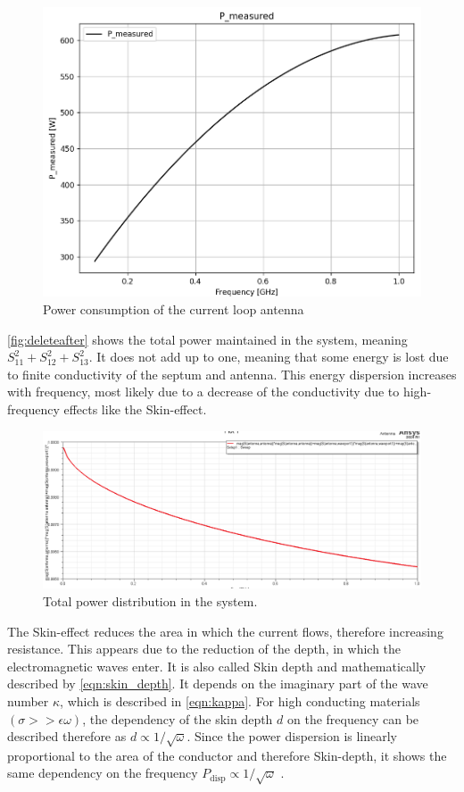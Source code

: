 \begin{figure}[h]
	\centering
	\includegraphics[width=0.5\linewidth]{content/30_simulations/img/current_loop_power_consumption}
	\caption{Power consumption of the current loop antenna}
	\label{fig:currentlooppowerconsumption}
\end{figure}

\autoref{fig:deleteafter} shows the total power maintained in the system, meaning $S_{11}^2+S_{12}^2+S_{13}^2$. It does not add up to one, meaning that some energy is lost due to finite conductivity of the septum and antenna. This energy dispersion increases with frequency, most likely due to a decrease of the conductivity due to high-frequency effects like the Skin-effect. 

\begin{figure}[h]
	\centering
	\includegraphics[width=0.7\linewidth]{content/30_simulations/img/delete_after}
	\caption{Total power distribution in the system.}
	\label{fig:deleteafter}
\end{figure}

The Skin-effect reduces the area in which the current flows, therefore increasing resistance. This appears due to the reduction of the depth, in which the electromagnetic waves enter. It is also called Skin depth and mathematically described by \autoref{eqn:skin_depth}. It depends on the imaginary part of the wave number $\kappa$, which is described in \autoref{eqn:kappa}. For high conducting materials $\left(\sigma >> \epsilon\omega\right)$, the dependency of the skin depth $d$ on the frequency can be described therefore as $d \propto 1/\sqrt{\omega}$. Since the power dispersion is linearly proportional to the area of the conductor and therefore Skin-depth, it shows the same dependency on the frequency $P_\mathrm{disp}\propto 1/\sqrt{\omega}$ \cite{Griffiths_2024}.  

